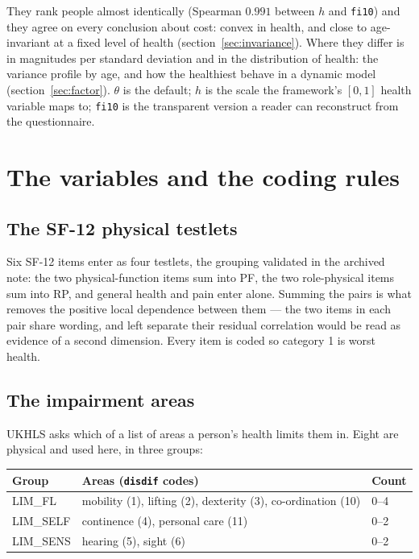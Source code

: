 \documentclass[11pt]{article}
\newcommand{\code}[1]{\texttt{\small #1}}
\begin{document}
They rank people almost identically (Spearman $0.991$ between $h$ and
\code{fi10}) and they agree on every conclusion about cost: convex in health,
and close to age-invariant at a fixed level of health (section~\ref{sec:invariance}).
Where they differ is in magnitudes per standard deviation and in the
distribution of health: the variance profile by age, and how the healthiest
behave in a dynamic model (section~\ref{sec:factor}). $\theta$ is the default; $h$ is the scale the
framework's $[0,1]$ health variable maps to; \code{fi10} is the transparent
version a reader can reconstruct from the questionnaire.

\section{The variables and the coding rules}

\subsection{The SF-12 physical testlets}

Six SF-12 items enter as four testlets, the grouping validated in the archived
note: the two physical-function items sum into PF, the two role-physical items
sum into RP, and general health and pain enter alone. Summing the pairs is what
removes the positive local dependence between them --- the two items in each
pair share wording, and left separate their residual correlation would be read
as evidence of a second dimension. Every item is coded so category 1 is worst
health.

\subsection{The impairment areas}

UKHLS asks which of a list of areas a person's health limits them in. Eight are
physical and used here, in three groups:

\begin{center}\small
\begin{tabular}{lll}
\toprule
Group & Areas (\code{disdif} codes) & Count \\
\midrule
LIM\_FL & mobility (1), lifting (2), dexterity (3), co-ordination (10) & 0--4 \\
LIM\_SELF & continence (4), personal care (11) & 0--2 \\
LIM\_SENS & hearing (5), sight (6) & 0--2 \\
\bottomrule
\end{tabular}
\end{center}
\end{document}
